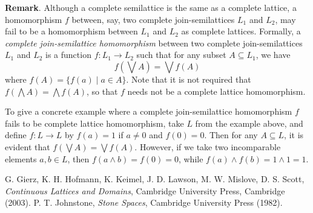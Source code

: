 \documentclass[12pt]{article}
\begin{document}
\textbf{Remark}.  Although a complete semilattice is the same as a complete lattice, a homomorphism $f$ between, say, two complete join-semilattices $L_1$ and $L_2$, may fail to be a homomorphism between $L_1$ and $L_2$ as complete lattices.  Formally, a \emph{complete join-semilattice homomorphism} between two complete join-semilattices $L_1$ and $L_2$ is a function $f:L_1\to L_2$ such that for any subset $A\subseteq L_1$, we have $$f(\bigvee A)=\bigvee f(A)$$ where $f(A)=\lbrace f(a)\mid a\in A\rbrace$.  Note that it is not required that $f(\bigwedge A)=\bigwedge f(A)$, so that $f$ needs not be a complete lattice homomorphism.

To give a concrete example where a complete join-semilattice homomorphism $f$ fails to be complete lattice homomorphism, take $L$ from the example above, and define $f:L\to L$ by $f(a)=1$ if $a\ne 0$ and $f(0)=0$.  Then for any $A\subseteq L$, it is evident that $f(\bigvee A)=\bigvee f(A)$.  However, if we take two incomparable elements $a,b\in L$, then $f(a\wedge b)=f(0)=0$, while $f(a)\wedge f(b)= 1\wedge 1=1$.

\begin{thebibliography}{8}
 G. Gierz, K. H. Hofmann, K. Keimel, J. D. Lawson, M. W. Mislove, D. S. Scott, {\em Continuous Lattices and Domains}, Cambridge University Press, Cambridge (2003).
 P. T. Johnstone, \emph{Stone Spaces}, Cambridge University Press (1982).
\end{thebibliography}
\end{document}
